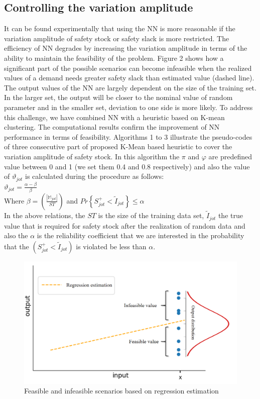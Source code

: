 \documentclass[letterpaper]{article} %
\begin{document}
\subsection{Controlling the variation amplitude}
It can be found experimentally that using the NN is more reasonable if the variation amplitude of safety stock or safety slack is more restricted. The efficiency of NN degrades by increasing the variation amplitude in terms of the ability to maintain the feasibility of the problem. Figure 2 shows how a significant part of the possible scenarios can become infeasible when the realized values of a demand needs greater safety slack than estimated value (dashed line). The output values of the NN are largely dependent on the size of the training set. In the larger set, the output will be closer to the nominal value of random parameter and in the smaller set, deviation to one side is more likely. To address this challenge, we have combined NN with a heuristic based on K-mean clustering. The computational results confirm the improvement of NN performance in terms of feasibility. Algorithms 1 to 3 illustrate the pseudo-codes of three consecutive part of proposed K-Mean based heuristic to cover the variation amplitude of safety stock. In this algorithm the $\pi$ and $\varphi$ are predefined value between 0 and 1 (we set them 0.4 and 0.8 respectively) and also the value of $\vartheta_{jot}$ is calculated during the procedure as follows:
\\
$\vartheta_{jot}=\frac{\alpha-\beta}{\beta}$
\\
Where $\beta=\left(\frac{|\mathbb{M}_{jot}|}{ST} \right)$ and $Pr\left\{S_{jot}^{+}<\tilde{I}_{jot}\right\}\leq\alpha$\\
In the above relations, the $ST$ is the size of the training data set, $\tilde{I}_{jot}$ the true value that is required for safety stock after the realization of random data and also the $\alpha$ is the reliability coefficient that we are interested in the probability that the $\left(S_{jot}^{+}<\tilde{I}_{jot}\right)$ is violated be less than $\alpha$. 
\begin{figure}[t]
\centering
\includegraphics[width=0.9\columnwidth]{figure/fig4.png} %
\caption{Feasible and infeasible scenarios based on regression estimation }
\label{fig3}
\end{figure}
\end{document}
